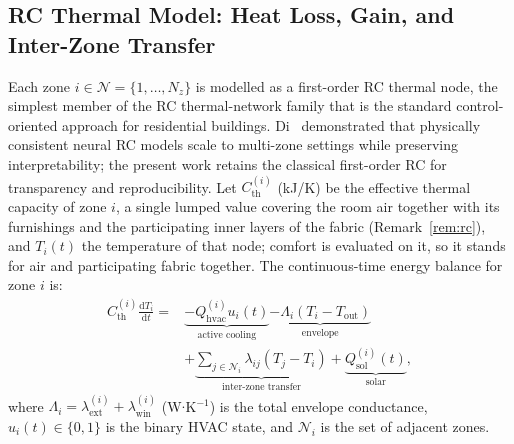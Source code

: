 \documentclass[pdflatex,sn-mathphys-num,iicol]{sn-jnl}
\theoremstyle{thmstyleone}\newtheorem{proposition}{Proposition}\newtheorem{corollary}{Corollary}
\theoremstyle{thmstyletwo}\newtheorem{remark}{Remark}\newtheorem{observation}{Observation}
\theoremstyle{thmstylethree}\newtheorem{definition}{Definition}
\newcommand{\Tout}{T_{\mathrm{out}}}
\newcommand{\Cth}{C_{\mathrm{th}}}
\newcommand{\lext}{\lambda_{\mathrm{ext}}}
\newcommand{\lwin}{\lambda_{\mathrm{win}}}
\newcommand{\lij}{\lambda_{ij}}
\newcommand{\Qhvac}{Q_{\mathrm{hvac}}}
\begin{document}
\subsection{RC Thermal Model: Heat Loss, Gain, and Inter-Zone Transfer}
\label{subsec:thermal}
 
Each zone $i\in\mathcal{N}=\{1,\ldots,N_z\}$ is modelled as a first-order RC thermal node, the simplest member of the RC thermal-network family \citep{Drgoona2021,Wang2021RC,Shi2022} that is the standard control-oriented approach for residential buildings. Di~\citet{DiNatale2023} demonstrated that physically consistent neural RC models scale to multi-zone settings while preserving interpretability; the present work retains the classical first-order RC for transparency and reproducibility. Let $\Cth^{(i)}$ (kJ/K) be the effective thermal capacity of zone $i$, a single lumped value covering the room air together with its furnishings and the participating inner layers of the fabric (Remark~\ref{rem:rc}), and $T_i(t)$ the temperature of that node; comfort is evaluated on it, so it stands for air and participating fabric together. The continuous-time energy balance for zone $i$ is:
\begin{equation}
\begin{split}
  \Cth^{(i)}\frac{\mathrm{d}T_i}{\mathrm{d}t}
  ={}&\underbrace{-\Qhvac^{(i)}u_i(t)}_{\text{active cooling}}
    \underbrace{-\Lambda_i\!\left(T_i-\Tout\right)}_{\text{envelope}}\\
  &+\underbrace{\sum_{j\in\mathcal{N}_i}\lij\!\left(T_j-T_i\right)}_{\text{inter-zone transfer}}
   +\underbrace{Q_{\mathrm{sol}}^{(i)}(t)}_{\text{solar}},
\end{split}
  \label{eq:rc_cont}
\end{equation}
where $\Lambda_i=\lext^{(i)}+\lwin^{(i)}$ (W$\cdot$K$^{-1}$) is the total envelope conductance, $u_i(t)\in\{0,1\}$ is the binary HVAC state, and $\mathcal{N}_i$ is the set of adjacent zones.
 
\end{document}
